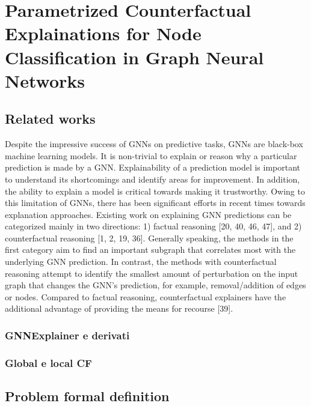 \documentclass[binding=0.6cm]{sapthesis}
\begin{document}
\chapter[CFPGExplainer]{Parametrized Counterfactual Explainations for Node Classification in Graph Neural Networks}
\label{chap:3-CFPG}

\section{Related works}
\label{sec:cfpg.bg}
Despite the impressive success of GNNs on predictive tasks, GNNs are black-box machine learning models. It is non-trivial to explain or reason why a particular prediction is made by a GNN. Explainability of a prediction model is important to understand its shortcomings and identify areas for improvement. In addition, the ability to explain a model is critical towards making it trustworthy. Owing to this limitation of GNNs, there has been significant efforts in recent times towards explanation approaches. Existing work on explaining GNN predictions can be categorized mainly in two directions: 1) factual reasoning [20, 40, 46, 47], and 2) counterfactual reasoning [1, 2, 19, 36]. Generally speaking, the methods in the first category aim to find an important subgraph that correlates most with the underlying GNN prediction. In contrast, the methods with counterfactual reasoning attempt to identify the smallest amount of perturbation on the input graph that changes the GNN’s prediction, for example, removal/addition of edges or nodes. Compared to factual reasoning, counterfactual explainers have the additional advantage of providing the means for recourse [39].

\subsection{GNNExplainer e derivati}
\label{sec:cfpg.bg.gnnexplainer}

\subsection{Global e local CF}
\label{sec:cfpg.bg.global-local-expl}


\section{Problem formal definition}
\label{sec:cfpg.bg.form-def}
\end{document}
